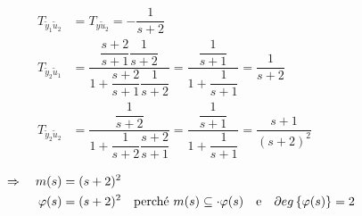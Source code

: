 \documentclass[../main.tex]{subfiles}
\begin{document}
\begin{mdframed}[style=Exercise]
\begin{Exercise}[title={Studio di un sistema dato in $ T(s) $}]
\begin{itemize}
\[\begin{aligned}
								\\
								T_{\tilde y_1 \tilde u_2} &= T_{y \tilde u_2} = -\dfrac{1}{s+2}
								\\
								T_{\tilde y_2 \tilde u_1} &= \dfrac{\dfrac{s+2}{s+1}\dfrac{1}{s+2}}{1+\dfrac{s+2}{s+1}\dfrac{1}{s+2}} = \dfrac{\dfrac{1}{s+1}}{1+\dfrac{1}{s+1}} = \dfrac{1}{s+2}
								\\
								T_{\tilde y_2 \tilde u_2} &= \dfrac{\dfrac{1}{s+2}}{1+\dfrac{1}{s+2}\dfrac{s+2}{s+1}} = \dfrac{\dfrac{1}{s+1}}{1+\dfrac{1}{s+1}} = \dfrac{s+1}{(s+2)^2}
								\\
							\end{aligned}
						\]
						\[
							\begin{aligned}
								\quad\Rightarrow\quad m(s) &= (s+2)^2
								\\
								\varphi(s) &= (s+2)^2 \quad \text{perch\'e}\ m(s) \subseteq\cdot \varphi(s) \quad \text{e} \quad \partial eg \left\lbrace \varphi(s) \right\rbrace = 2
							\end{aligned}
						\]
				\end{itemize}
			

\end{Exercise}
\end{mdframed}
\end{document}
